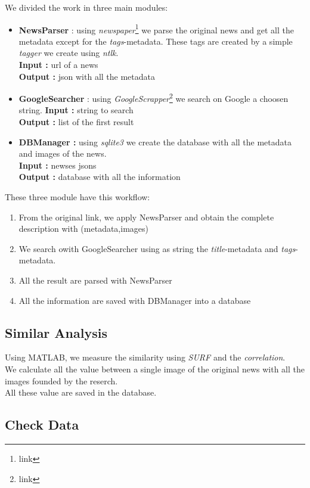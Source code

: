 \documentclass[10pt, journal,twocolumn]{IEEEtran}
\begin{document}
We divided the work in three main modules:
\begin{itemize}
  \item \textbf{NewsParser} : using \emph{newspaper}\footnote{link} we parse the original news and get all the metadata except for the \emph{tags}-metadata. These tags are created by a simple \emph{tagger} we create using \emph{ntlk}.\\
  \textbf{Input : } url of a news\\
  \textbf{Output : } json with all the metadata
  \item \textbf{GoogleSearcher} : using \emph{GoogleScrapper}\footnote{link} we search on Google a choosen string.
  \textbf{Input : } string to search\\
  \textbf{Output : } list of the first result
  \item \textbf{DBManager : } using \emph{sqlite3} we create the database with all the metadata and images of the news.\\
  \textbf{Input : } newses jsons\\
  \textbf{Output : } database with all the information 
\end{itemize}

These three module have this workflow:

\begin{enumerate}
  \item From the original link, we apply NewsParser and obtain the complete description with (metadata,images)
  \item We search owith GoogleSearcher using as string the \emph{title}-metadata and \emph{tags}-metadata.
  \item All the result are parsed with NewsParser
  \item All the information are saved with DBManager into a database
\end{enumerate}


\subsection{Similar Analysis}

Using MATLAB, we measure the similarity using \emph{SURF} and the \emph{correlation}.\\
We calculate all the value between a single image of the original news with all the images founded by the reserch.\\[0,1cm]
All these value are saved in the database.

\subsection{Check Data}
\end{document}
